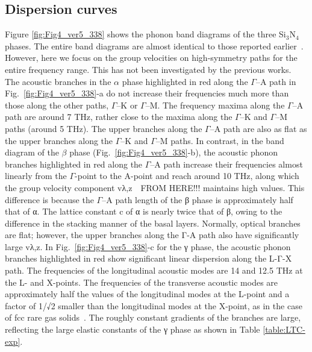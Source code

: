 \documentclass[twocolumn,amsmath,amssymb,a4paper,prb,superscriptaddress,floatfix]{revtex4-1}
\begin{document}
\subsection{Dispersion curves}
Figure \ref{fig:Fig4_ver5_338} shows the phonon band diagrams of the three
Si$_3$N$_4$ phases. The entire band diagrams are almost identical to those reported
earlier~\cite{kuwabara,xu}. However, here we focus on the group velocities on
high-symmetry paths for the entire frequency range. This has not been
investigated by the previous works.
The acoustic branches in the $\alpha$ phase highlighted in red along the
$\Gamma$--A path in
Fig.~\ref{fig:Fig4_ver5_338}-a do not increase their frequencies much more
than those along the other paths, $\Gamma$--K or $\Gamma$--M. The frequency maxima along the
$\Gamma$--A path are around 7 THz, rather close to the maxima along the
$\Gamma$--K and $\Gamma$--M
paths (around 5 THz). The upper branches along the $\Gamma$--A path are also as flat
as the upper branches along the $\Gamma$--K and $\Gamma$--M paths.
In contrast, in the band diagram of the $\beta$ phase
(Fig.~\ref{fig:Fig4_ver5_338}-b), the acoustic phonon branches highlighted in
red along the $\Gamma$--A path increase their frequencies almost linearly from the
$\Gamma$-point to the A-point and reach around 10 THz, along which the group velocity
component vλ,z　FROM HERE!!!  maintains high values. This difference is because the
$\Gamma$--A path
length of the β phase is approximately half that of α. The lattice constant c
of α is nearly twice that of β, owing to the difference in the stacking manner
of the basal layers. Normally, optical branches are flat; however, the upper
branches along the Γ-A path also have significantly large vλ,z.
In Fig.~\ref{fig:Fig4_ver5_338}-c for the γ phase, the acoustic phonon
branches highlighted in red show significant linear dispersion along the L-Γ-X
path. The frequencies of the longitudinal acoustic modes are 14 and 12.5 THz
at the L- and X-points. The frequencies of the transverse acoustic modes are
approximately half the values of the longitudinal modes at the L-point and a
factor of 1/√2 smaller than the longitudinal modes at the X-point, as in the
case of fcc rare gas solids~\cite{dove-p30}. The roughly constant gradients of
the branches are large, reflecting the large elastic constants of the γ phase
as shown in Table \ref{table:LTC-exp}.
\end{document}
